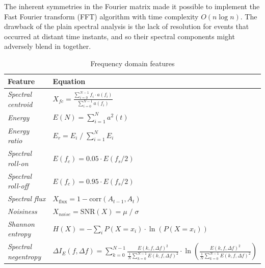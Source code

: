 The inherent symmetries in the Fourier matrix made it possible to implement the Fast Fourier transform (FFT) algorithm with time complexity $O(n \log n)$. The drawback of the plain spectral analysis is the lack of resolution for events that occurred at distant time instants, and so their spectral components might adversely blend in together. 

\begin{table}[ht]
\renewcommand{\arraystretch}{2}
\centering
\begin{adjustbox}{width=\columnwidth,center}
\begin{tabular}{|l|l|}
\hline
\textbf{Feature}           & \textbf{Equation}                                                                                                  \\ \hline
\textit{Spectral centroid} & $ X_{fc} = \frac{\sum_{i = 0}^{N - 1}{f_i \cdot a(f_i)}}{\sum_{i = 0}^{N - 1}{a(f_i)}}$                   \\ \hline 
\textit{Energy}            & $ E(N) = \sum_{i = 1}^{N} a^2(t) $                                                                    \\ \hline \textit{Energy ratio}                & $E_r = E_i \;/\; \sum_{i = 1}^{N}{E_i} $                                                        \\ \hline
\textit{Spectral roll-on} & $ E(f_c) = 0.05 \cdot E(f_s / 2) $ \\ \hline                    
\textit{Spectral roll-off} & $ E(f_c) = 0.95 \cdot E(f_s / 2) $                                                   \\ \hline
\textit{Spectral flux}     & $X_{\mathrm{flux}} = 1 - \mathrm{corr}(A_{t-1}, A_t)$ \\ \hline 
\textit{Noisiness}                   & $X_{noise} = \mathrm{SNR}(X) = \mu \;/\; \sigma $                             \\ \hline
\textit{Shannon entropy}      & $H(X) = - \sum_{i} P(X = x_i) \cdot \ln(P(X = x_i)) $                                                  \\ \hline
\textit{Spectral negentropy}      & $\Delta I_E(f, \Delta f) = \sum_{k = 0}^{N - 1}{\frac{E(k, f, \Delta f)^2}{\frac{1}{N} \sum_{k=0}^{N-1} E(k, f, \Delta f)^2}} \cdot \ln\left(\frac{E(k, f, \Delta f)^2}{\frac{1}{N} \sum_{k=0}^{N-1} E(k, f, \Delta f)^2}\right)$                                                \\ \hline
\end{tabular}
\end{adjustbox}
\caption{Frequency domain features}
\label{tab:fd-features}
\end{table}

